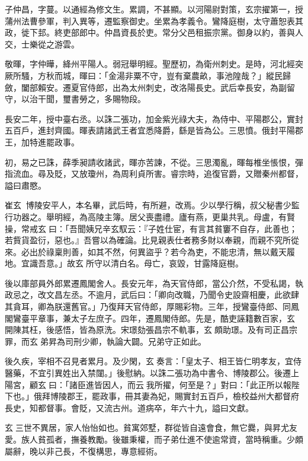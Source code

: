 \begin{pinyinscope}
 子仲昌，字蔓。以通經為修文生。累調，不甚顯。以河陽尉對策，玄宗擢第一，授蒲州法曹參軍，判入異等，遷監察御史。坐累為孝義令。鸞降庭樹，太守蕭恕表其政，徙下邽。終吏部郎中。仲昌資長於吏。常分父邑租振宗黨。御身以約，善與人交，士樂從之游雲。



 敬暉，字仲曄，絳州平陽人。弱冠舉明經。聖歷初，為衛州刺史。是時，河北經突厥所騷，方秋而城，暉曰：「金湯非粟不守，豈有棄農畝，事池隍哉？」縱民歸斂，闔部賴安。遷夏官侍郎，出為太州刺史，改洛陽長史。武后幸長安，為副留守，以治干聞，璽書勞之，多賜物段。



 長安二年，授中臺右丞。以誅二張功，加金紫光祿大夫，為侍中、平陽郡公，實封五百戶，進封齊國。暉表請諸武王者宜悉降爵，繇是皆為公。三思憤。俄封平陽郡王，加特進罷政事。



 初，易之已誅，薛季昶請收諸武，暉亦苦諫，不從。三思濁亂，暉每椎坐悵恨，彈指流血。尋及貶，又放瓊州，為周利貞所害。睿宗時，追復官爵，又贈秦州都督，謚曰肅愍。



 崔玄，博陵安平人，本名畢，武后時，有所避，改焉。少以學行稱，叔父秘書少監行功器之。舉明經，為高陵主簿。居父喪盡禮。廬有燕，更巢共乳。母盧，有賢操，常戒玄曰：「吾聞姨兄辛玄馭云：『子姓仕宦，有言其貧窶不自存，此善也；若貲貨盈衍，惡也。』吾嘗以為確論。比見親表仕者務多財以奉親，而親不究所從來。必出於祿稟則善，如其不然，何異盜乎？若今為吏，不能忠清，無以戴天履地。宜識吾意。」故玄所守以清白名。母亡，哀毀，甘露降庭樹。



 後以庫部員外郎累遷鳳閣舍人。長安元年，為天官侍郎，當公介然，不受私謁，執政忌之，改文昌左丞。不逾月，武后曰：「卿向改職，乃聞令史設齋相慶，此欲肆其貪耳，卿為朕還舊官。」乃復拜天官侍郎，厚賜彩物。三年，授鸞臺侍郎、同鳳閣鸞臺平章事，兼太子左庶子。四年，遷鳳閣侍郎。先是，酷吏誣籍數百家，玄開陳其枉，後感悟，皆為原洗。宋璟劾張昌宗不軌事，玄頗助璟。及有司正昌宗罪，而玄弟昇為司刑少卿，執論大闢。兄弟守正如此。



 後久疾，宰相不召見者累月。及少閑，玄奏言：「皇太子、相王皆仁明孝友，宜侍醫藥，不宜引異姓出入禁闥。」後慰納。以誅二張功為中書令、博陵郡公。後遷上陽宮，顧玄曰：「諸臣進皆因人，而云我所擢，何至是？」對曰：「此正所以報陛下也。」俄拜博陵郡王，罷政事，冊其妻為妃，賜實封五百戶，檢校益州大都督府長史，知都督事。會貶，又流古州。道病卒，年六十九，謚曰文獻。



 玄三世不異居，家人怡怡如也。貧寓郊墅，群從皆自遠會食，無它爨，與昇尤友愛。族人貧孤者，撫養教勵。後雖秉權，而子弟仕進不使逾常資，當時稱重。少頗屬辭，晚以非己長，不復構思，專意經術。




\end{pinyinscope}
